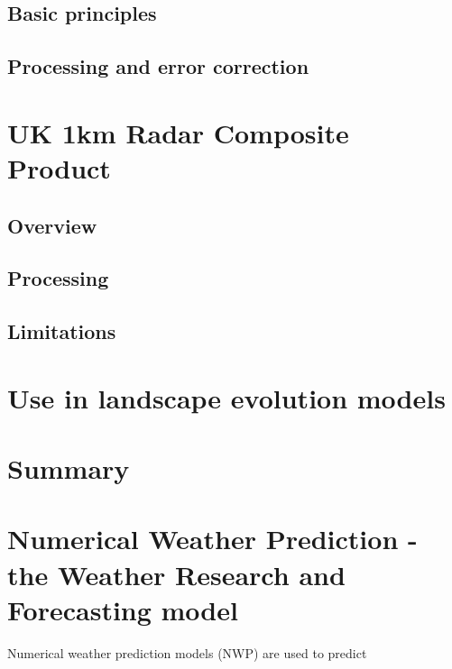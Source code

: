 \subsection{Basic principles}

\subsection{Processing and error correction}



\section{UK 1km Radar Composite Product}
\label{NIMROD}

\subsection{Overview}

\subsection{Processing}

\subsection{Limitations}

\section{Use in landscape evolution models}

\section{Summary}

%
%

\section{Numerical Weather Prediction - the Weather Research and Forecasting model}
\label{WRF}

Numerical weather prediction models (NWP) are used to predict 
